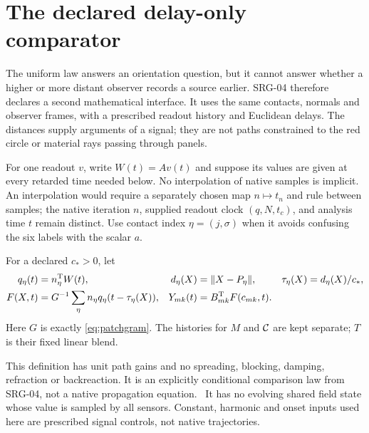 \section{The declared delay-only comparator}\label{sec:delay}
The uniform law answers an orientation question, but it cannot answer whether a higher or more distant observer records a source earlier. SRG-04 therefore declares a second mathematical interface. It uses the same contacts, normals and observer frames, with a prescribed readout history and Euclidean delays. The distances supply arguments of a signal; they are not paths constrained to the red circle or material rays passing through panels.

For one readout $v$, write $W(t)=Av(t)$ and suppose its values are given at every retarded time needed below. No interpolation of native samples is implicit. An interpolation would require a separately chosen map $n\mapsto t_n$ and rule between samples; the native iteration $n$, supplied readout clock $(q,N,t_c)$, and analysis time $t$ remain distinct. Use contact index $\eta=(j,\sigma)$ when it avoids confusing the six labels with the scalar $a$.

\begin{definition}\label{def:delay}
For a declared $c_*>0$, let
\begin{equation}\label{eq:delaylaw}
\begin{aligned}
q_\eta(t)&=n_\eta^{\mathrm T} W(t),&
d_\eta(X)&=\lVert X-P_\eta\rVert,&\tau_\eta(X)&=d_\eta(X)/c_*,\\
F(X,t)&=G^{-1}\sum_\eta n_\eta q_\eta(t-\tau_\eta(X)),&
Y_{mk}(t)&=B_{mk}^{\mathrm T} F(c_{mk},t).
\end{aligned}
\end{equation}
Here $G$ is exactly \eqref{eq:patchgram}. The histories for $M$ and $\mathcal C$ are kept separate; $T$ is their fixed linear blend.
\end{definition}
This definition has unit path gains and no spreading, blocking, damping, refraction or backreaction. It is an explicitly conditional comparison law from SRG-04, not a native propagation equation.~\cite[Eqn.~(3)]{SRG04} It has no evolving shared field state whose value is sampled by all sensors. Constant, harmonic and onset inputs used here are prescribed signal controls, not native trajectories.

